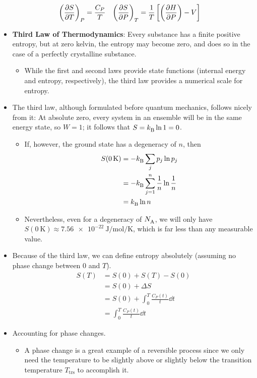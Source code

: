 \documentclass[../notes.tex]{subfiles}
\begin{document}
\begin{itemize}
    \begin{align*}
        \left( \pdv{S}{T} \right)_P &= \frac{C_P}{T}&
        \left( \pdv{S}{P} \right)_T &= \frac{1}{T}\left[ \left( \pdv{H}{P} \right)-V \right]
    \end{align*}
    \item \textbf{Third Law of Thermodynamics}: Every substance has a finite positive entropy, but at zero kelvin, the entropy may become zero, and does so in the case of a perfectly crystalline substance.
    \begin{itemize}
        \item While the first and second laws provide state functions (internal energy and entropy, respectively), the third law provides a numerical scale for entropy.
    \end{itemize}
    \item The third law, although formulated before quantum mechanics, follows nicely from it: At absolute zero, every system in an ensemble will be in the same energy state, so $W=1$; it follows that $S={k_\text{B}^{}}\ln 1=0$.
    \begin{itemize}
        \item If, however, the ground state has a degeneracy of $n$, then
        \begin{align*}
            S(\SI{0}{\kelvin}) &= -{k_\text{B}^{}}\sum_jp_j\ln p_j\\
            &= -{k_\text{B}^{}}\sum_{j=1}^n\frac{1}{n}\ln\frac{1}{n}\\
            &= {k_\text{B}^{}}\ln n
        \end{align*}
        \item Nevertheless, even for a degeneracy of ${N_\text{A}^{}}$, we will only have $S(\SI{0}{\kelvin})\approx\SI{7.56e-22}{\joule\per\mole\per\kelvin}$, which is far less than any measurable value.
    \end{itemize}
    \item Because of the third law, we can define entropy absolutely (assuming no phase change between 0 and $T$).
    \begin{align*}
        S(T) &= S(0)+S(T)-S(0)\\
        &= S(0)+\Delta S\\
        &= S(0)+\int_0^T\frac{C_P(t)}{t}\dd{t}\\
        &= \int_0^T\frac{C_P(t)}{t}\dd{t}
    \end{align*}
    \item Accounting for phase changes.
    \begin{itemize}
        \item A phase change is a great example of a reversible process since we only need the temperature to be slightly above or slightly below the transition temperature $T_\text{trs}$ to accomplish it.

\end{itemize}
\end{itemize}
\end{document}
